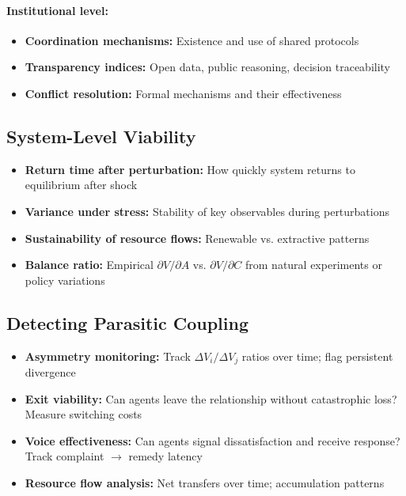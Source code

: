 \documentclass[11pt,a4paper]{article}
\begin{document}
\paragraph{Institutional level:}
\begin{itemize}
    \item \textbf{Coordination mechanisms:} Existence and use of shared protocols
    \item \textbf{Transparency indices:} Open data, public reasoning, decision traceability
    \item \textbf{Conflict resolution:} Formal mechanisms and their effectiveness
\end{itemize}

\subsection{System-Level Viability}

\begin{itemize}
    \item \textbf{Return time after perturbation:} How quickly system returns to equilibrium after shock
    \item \textbf{Variance under stress:} Stability of key observables during perturbations
    \item \textbf{Sustainability of resource flows:} Renewable vs. extractive patterns
    \item \textbf{Balance ratio:} Empirical $\partial V/\partial A$ vs. $\partial V/\partial C$ from natural experiments or policy variations
\end{itemize}

\subsection{Detecting Parasitic Coupling}

\begin{itemize}
    \item \textbf{Asymmetry monitoring:} Track $\Delta V_i / \Delta V_j$ ratios over time; flag persistent divergence
    \item \textbf{Exit viability:} Can agents leave the relationship without catastrophic loss? Measure switching costs
    \item \textbf{Voice effectiveness:} Can agents signal dissatisfaction and receive response? Track complaint $\to$ remedy latency
    \item \textbf{Resource flow analysis:} Net transfers over time; accumulation patterns
\end{itemize}
\end{document}

